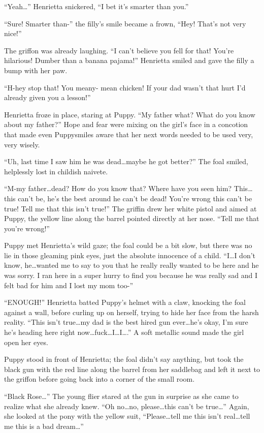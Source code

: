 ``Yeah\dots'' Henrietta snickered, ``I bet it's smarter than you.''

``Sure! Smarter than-'' the filly's smile became a frown, ``Hey! That's not very nice!''

The griffon was already laughing. ``I can't believe you fell for that! You're hilarious! Dumber than a banana pajama!'' Henrietta smiled and gave the filly a bump with her paw.

``H-hey stop that! You meany- mean chicken! If your dad wasn't that hurt I'd already given you a lesson!''

Henrietta froze in place, staring at Puppy. ``My father what? What do you know about my father?'' Hope and fear were mixing on the girl's face in a concotion that made even Puppysmiles aware that her next words needed to be used very, very wisely.

``Uh, last time I saw him he was dead\dots maybe he got better?'' The foal smiled, helplessly lost in childish naivete.

``M-my father\dots dead? How do you know that? Where have you seen him? This\dots this can't be, he's the best around he can't be dead! You're wrong this can't be true! Tell me that this isn't true!'' The griffin drew her white pistol and aimed at Puppy, the yellow line along the barrel pointed directly at her nose. ``Tell me that you're wrong!''

Puppy met Henrietta's wild gaze; the foal could be a bit slow, but there was no lie in those gleaming pink eyes, just the absolute innocence of a child. ``I\dots I don't know, he\dots wanted me to say to you that he really really wanted to be here and he was sorry. I ran here in a super hurry to find you because he was really sad and I felt bad for him and I lost my mom too-''

``ENOUGH!'' Henrietta batted Puppy's helmet with a claw, knocking the foal against a wall, before curling up on herself, trying to hide her face from the harsh reality. ``This isn't true\dots my dad is the best hired gun ever\dots he's okay, I'm sure he's heading here right now\dots fuck\dots I\dots I\dots.'' A soft metallic sound made the girl open her eyes.

Puppy stood in front of Henrietta; the foal didn't say anything, but took the black gun with the red line along the barrel from her saddlebag and left it next to the griffon before going back into a corner of the small room.

``Black Rose\dots'' The young flier stared at the gun in surprise as she came to realize what she already knew. ``Oh no\dots no, please\dots this can't be true\dots'' Again, she looked at the pony with the yellow suit, ``Please\dots tell me this isn't real\dots tell me this is a bad dream\dots''

